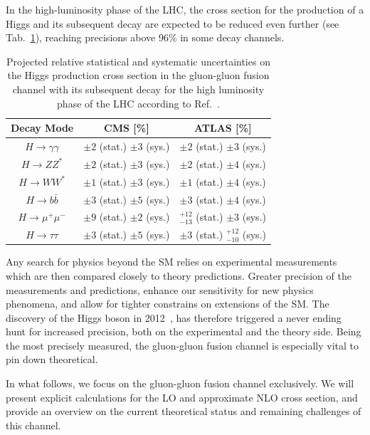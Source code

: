 In the high-luminosity phase of the \acs{LHC}, the cross section for the production of a Higgs and its subsequent decay are expected to be reduced even further (see Tab.~\ref{tab:4:HLLHC_projections}), reaching precisions above 96\% in some decay channels.
\begin{table}[h]
\centering
\begin{tabular}{ccc}
Decay Mode & CMS [\%] & ATLAS [\%] \\
\hline
$H \rightarrow \gamma \gamma$ & $\pm 2$ (stat.) $\pm 3$ (sys.) & $\pm 2$ (stat.) $\pm 3$ (sys.) \\
$H \rightarrow Z Z^*$ & $\pm 2$ (stat.) $\pm 3$ (sys.) & $\pm 2$ (stat.) $\pm 4$ (sys.) \\
$H \rightarrow W W^*$ & $\pm 1$ (stat.) $\pm 3$ (sys.) & $\pm 1$ (stat.) $\pm 4$ (sys.) \\
$H \rightarrow b\bar{b}$ & $\pm 3$ (stat.) $\pm 5$ (sys.) & $\pm 3$ (stat.) $\pm 4$ (sys.) \\
$H \rightarrow \mu^+ \mu^-$ & $\pm 9$ (stat.) $\pm 2$ (sys.) & ${}^{+12}_{-13}$ (stat.) $\pm 3$ (sys.) \\
$H \rightarrow \tau \tau$ & $\pm 3$ (stat.) $\pm 5$ (sys.) & $\pm 3$ (stat.) $ {}^{+12}_{-10}$ (sys.) \\
\end{tabular}
\caption{Projected relative statistical and systematic uncertainties on the Higgs production cross section in the gluon-gluon fusion channel with its subsequent decay for the high luminosity phase of the \acs{LHC} according to Ref.~\cite{Cepeda:2019klc}.}
\label{tab:4:HLLHC_projections}
\end{table}

Any search for physics beyond the \acs{SM} relies on experimental measurements which are then compared closely to theory predictions. Greater precision of the measurements and predictions, enhance our sensitivity for new physics phenomena, and allow for tighter constrains on extensions of the \acs{SM}. The discovery of the Higgs boson in 2012~\cite{ATLAS:2012yve, CMS:2012qbp}, has therefore triggered a never ending hunt for increased precision, both on the experimental and the theory side. Being the most precisely measured, the gluon-gluon fusion channel is especially vital to pin down theoretical.

In what follows, we focus on the gluon-gluon fusion channel exclusively. We will present explicit calculations for the \acs{LO} and approximate \acs{NLO} cross section, and provide an overview on the current theoretical status and remaining challenges of this channel.


